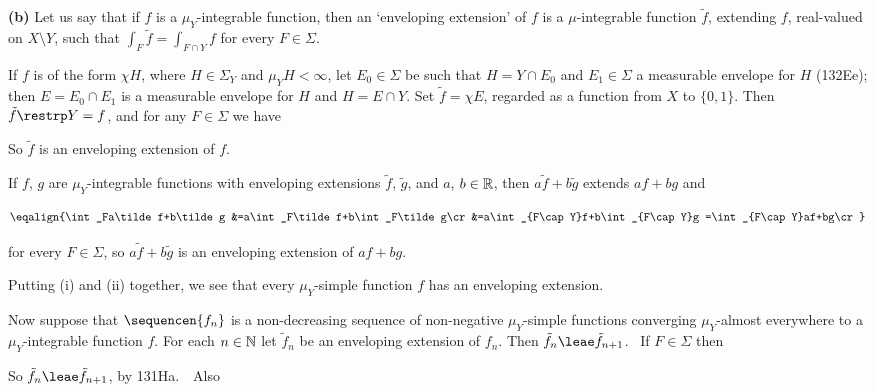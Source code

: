 {\medskip

{\bf (b)} Let us say that if $f$ is a $\mu_Y$-integrable function, then
an  `enveloping extension' of $f$ is a $\mu$-integrable function
$\tilde f$, extending $f$, real-valued on $X\setminus Y$, such that
$\int_F\tilde f=\int_{F\cap Y}f$ for every $F\in\Sigma$.

\medskip

 If $f$ is of the form $\chi H$, where $H\in\Sigma_Y$ and
$\mu_YH<\infty$, let $E_0\in\Sigma$ be such that $H=Y\cap E_0$ and
$E_1\in\Sigma$ a measurable envelope for $H$ (132Ee);   then
$E=E_0\cap E_1$ is a measurable envelope for $H$ and $H=E\cap Y$.   Set
$\tilde f=\chi E$, regarded as a function from $X$ to $\{0,1\}$.   Then
$\tilde f\restrp Y=f$, and for any $F\in\Sigma$ we have


\noindent So $\tilde f$ is an enveloping extension of $f$.

\medskip

 If $f$, $g$ are $\mu_Y$-integrable functions with
enveloping extensions $\tilde f$, $\tilde g$, and $a$, $b\in\Bbb R$,
then $a\tilde f+b\tilde g$ extends $af+bg$ and

$$\eqalign{\int_Fa\tilde f+b\tilde g
&=a\int_F\tilde f+b\int_F\tilde g\cr
&=a\int_{F\cap Y}f+b\int_{F\cap Y}g
=\int_{F\cap Y}af+bg\cr}$$

\noindent for every $F\in\Sigma$, so $a\tilde f+b\tilde g$ is an
enveloping extension of $af+bg$.

\medskip

 Putting (i) and (ii) together, we see that every
$\mu_Y$-simple function $f$ has an enveloping extension.

\medskip

 Now suppose that $\sequencen{f_n}$ is a non-decreasing
sequence of non-negative $\mu_Y$-simple functions converging
$\mu_Y$-almost everywhere to a $\mu_Y$-integrable function $f$.   For
each $n\in\Bbb N$ let $\tilde f_n$ be an enveloping extension of $f_n$.
Then $\tilde f_n\leae\tilde f_{n+1}$.   \Prf\ If $F\in\Sigma$ then


\noindent So $\tilde f_n\leae\tilde f_{n+1}$, by 131Ha.\ \QeD\   Also


}
